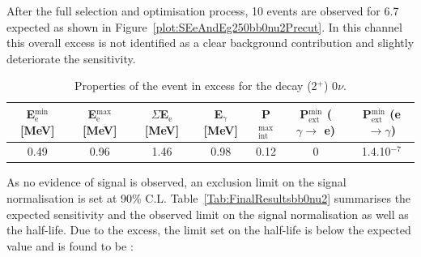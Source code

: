 \documentclass[main.tex]{subfiles}
\begin{document}





\NI After the full selection and optimisation process, 10 events are observed for 6.7 expected as shown in Figure~\ref{plot:SEeAndEg250bb0nu2Precut}. In this channel this overall excess is not identified as a clear background contribution and slightly deteriorate the sensitivity.


\ifx
\begin{table}[h!]
\centering
\begin{tabular}{ccccccc}
\hline
E$^{\text{min}}_\text{e}$ [MeV] & E$^{\text{max}}_\text{e}$ [MeV]& $\Sigma$E$_\text{e}$ [MeV]& E$_{\gamma}$ [MeV]& P$_{\text{int}}^{\text{max}}$ & P$_{\text{ext}}^{\text{min}}$ ($\gamma \rightarrow$ e) & P$_{\text{ext}}^{\text{min}}$ (e $ \rightarrow \gamma$) \\
\hline
0.49 & 0.96 & 1.46 & 0.98 & 0.12 & 0 & 1.4.10$^{-\text{7}}$  \\
\hline
\end{tabular}
\caption{Properties of the event in excess for the decay (2$^+$) 0$\nu$.}
\label{tab:EventExcessbb0nu2}
\end{table}
\fi


\bigskip


\NI As no evidence of signal is observed, an exclusion limit on the signal normalisation is set at 90\% C.L. Table~\ref{Tab:FinalResultsbb0nu2} summarises the expected sensitivity and the observed limit on the signal normalisation as well as the half-life. Due to the excess, the limit set on the half-life is below the expected value and is found to be : 
\end{document}
